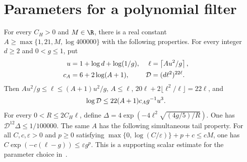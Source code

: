 \section{Parameters for a polynomial filter}

\begin{lemma}
    \label{thm:chain_polynomial_filter_parameters}
    \leanok
    For every $C_H>0$ and $M\in\R$, there is a real constant
    $A\ge\max\{1,21,M,\log400000\}$ with the following properties.
    For every integer $d\ge2$ and $0<g\le1$, put
    \begin{align}
        u    & =1+\log d+\log(1/g),                   &
        \ell & =\left\lceil Au^2/g\right\rceil,\notag                                           \\
        c_A  & =6+2\log(A+1),                         & \mathcal D & =(d\ell^2)^{22\ell}.\notag
    \end{align}
    Then $Au^2/g\le\ell\le(A+1)u^2/g$, $A\le\ell$,
    $20\ell+2\lfloor\ell^2/\ell\rfloor=22\ell$, and
    \begin{align}
        \log\mathcal D\le22(A+1)c_Ag^{-1}u^3.\notag
    \end{align}
    For every $0<R\le2C_H\ell$, define
    $\Delta=4\exp(-4\ell^2\sqrt{(4g/5)/R})$. One has
    $\mathcal D^{12}\Delta\le1/100000$.
    The same $A$ has the following simultaneous tail property. For all
    $C,c,\varepsilon>0$ and $p\ge0$ satisfying
    $\max\{0,\log(C/\varepsilon)\}+p+c\le cM$, one has
    $C\exp(-c(\ell-g))\le\varepsilon g^p$.
    This is a supporting scalar estimate for the parameter choice
    in~\cite[lines 1010--1024]{Arad2016RigorousRG}.
\end{lemma}

